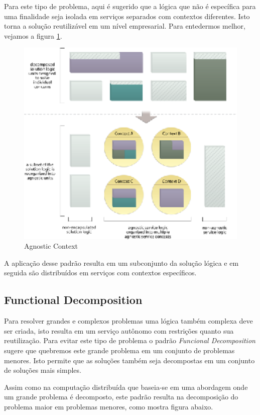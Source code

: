 \documentclass[12pt]{article}
\begin{document}
Para este tipo de problema, aqui é sugerido que a lógica que não é específica para uma finalidade seja isolada em serviços separados com contextos diferentes. Isto torna a solução reutilizável em um nível empresarial. Para entedermos melhor, vejamos a figura \ref{fig:2}.

\begin{figure}[H]
	\centering
	\includegraphics[width=14cm]{img/fig2.eps}
	\caption{Agnostic Context}
	\label{fig:2}
\end{figure}

A aplicação desse padrão resulta em um subconjunto da solução lógica e em seguida são distribuídos em serviços com contextos específicos.

\subsection{Functional Decomposition}

Para resolver grandes e complexos problemas uma lógica também complexa deve ser criada, isto resulta em um serviço autônomo com restrições quanto sua reutilização.	
Para evitar este tipo de problema o padrão \textit{Funcional Decomposition} sugere que quebremos este grande problema em um conjunto de problemas menores. Isto permite que as soluções também seja decompostas em um conjunto de soluções mais simples.

Assim como na computação distribuída que baseia-se em uma abordagem  onde um grande problema é decomposto, este padrão resulta na decomposição do problema maior em problemas menores, como mostra figura abaixo.
\end{document}
